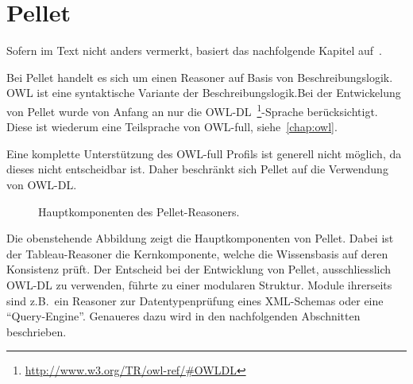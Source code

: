 \section{Pellet}
\label{sec:inferenz_pellet}
Sofern im Text nicht anders vermerkt, basiert das nachfolgende Kapitel auf~\cite{sirin:pellet05}.

Bei Pellet handelt es sich um einen Reasoner auf Basis von Beschreibungslogik. OWL ist eine syntaktische Variante der Beschreibungslogik.\@ Bei der Entwickelung von Pellet wurde von Anfang an nur die OWL-DL~\footnote{\url{http://www.w3.org/TR/owl-ref/\#OWLDL}}-Sprache berücksichtigt. Diese ist wiederum eine Teilsprache von OWL-full, siehe~\autoref{chap:owl}.

Eine komplette Unterstützung des OWL-full Profils ist generell nicht möglich, da dieses nicht entscheidbar ist. Daher beschränkt sich Pellet auf die Verwendung von OWL-DL\@.~\cite[S. 13]{sirin:pellet05}

\begin{figure}[htbp]
\centering {}
\caption{Hauptkomponenten des Pellet-Reasoners.\label{fig:pellet_komponenten}\protect\footnotemark}
\end{figure}

Die obenstehende Abbildung zeigt die Hauptkomponenten von Pellet. Dabei ist der Tableau-Reasoner die Kernkomponente, welche die Wissensbasis auf deren Konsistenz prüft. Der Entscheid bei der Entwicklung von Pellet, ausschliesslich OWL-DL zu verwenden, führte zu einer modularen Struktur. Module ihrerseits sind z.B.\ ein Reasoner zur Datentypenprüfung eines XML-Schemas oder eine ``Query-Engine''. Genaueres dazu wird in den nachfolgenden Abschnitten beschrieben.

